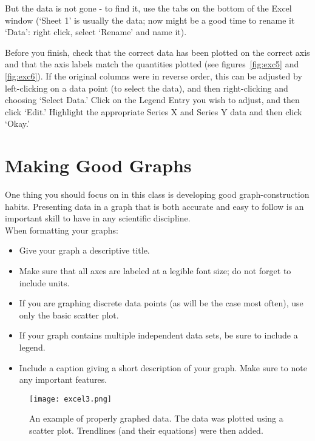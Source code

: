 But the data is not gone - to find it, use the tabs on the bottom of the Excel window (`Sheet 1' is usually the data; now might be a good time to rename it `Data': right click, select `Rename' and name it).
\par 
Before you finish, check that the correct data has been plotted on the correct axis and that the axis labels match the quantities plotted (see figures~\ref{fig:exc5} and \ref{fig:exc6}). 
If the original columns were in reverse order, this can be adjusted by left-clicking on a data point (to select the data), and then right-clicking and choosing `Select Data.' 
Click on the Legend Entry you wish to adjust, and then click `Edit.' 
Highlight the appropriate Series X and Series Y data and then click `Okay.'

\section*{Making Good Graphs}
One thing you should focus on in this class is developing good graph-construction habits.
Presenting data in a graph that is both accurate and easy to follow is an important skill to have in any scientific discipline. \\
When formatting your graphs:
\begin{itemize}
\item Give your graph a descriptive title.
\item Make sure that all axes are labeled at a legible font size; do not forget to include units.
\item If you are graphing discrete data points (as will be the case most often), use only the basic scatter plot.
\item If your graph contains multiple independent data sets, be sure to include a legend.
\item Include a caption giving a short description of your graph. Make sure to note any important features.
\end{itemize}
\begin{figure}[ht]
\texttt{[image: excel3.png]}
\centering
\caption{An example of properly graphed data. The data was plotted using a scatter plot. Trendlines (and their equations) were then added.}
\label{fig:exc3}
\end{figure}

